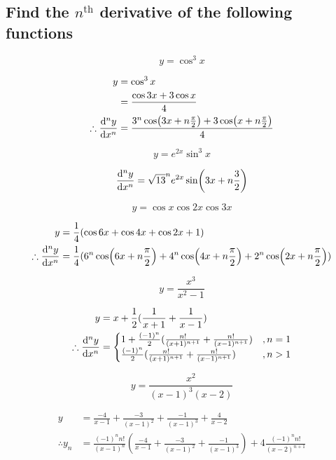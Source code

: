 \subsection{Find the $n^\text{th}$ derivative of the following functions}
\begin{asign}
	\[y=\cos^3x\]
\end{asign}
\begin{anse}
	\[\begin{split}
		y&=\cos^3x\\
		&=\frac{\cos3x+3\cos x}{4}\\
		\therefore \dv[n]{y}{x}&=\frac{3^n\cos(3x+n\frac{\pi}{2})+3\cos(x+n\frac{\pi}{2})}{4}
	\end{split}\]
\end{anse}
\begin{asign}
	\[y=e^{2x}\sin^3x\]
\end{asign}
\begin{anse}
	\[\dv[n]{y}{x}=\sqrt{13}^ne^{2x}\sin(3x+n\frac{3}{2})\]
\end{anse}
\begin{asign}
	\[y=\cos x\cos 2x\cos3x\]
\end{asign}
\begin{anse}
	\[\begin{split}
		y&=\frac{1}{4}(\cos6x+\cos4x+\cos2x+1)\\
		\therefore \dv[n]{y}{x}&=\frac{1}{4}(6^n\cos(6x+n\frac{\pi}{2})+4^n\cos(4x+n\frac{\pi}{2})+2^n\cos(2x+n\frac{\pi}{2}))
	\end{split}\]
\end{anse}
\begin{asign}
	\[y=\frac{x^3}{x^2-1}\]
\end{asign}
\begin{anse}
	\[\begin{split}
		y&=x+\frac{1}{2}(\frac{1}{x+1}+\frac{1}{x-1})\\
		\therefore \dv[n]{y}{x}&=\begin{cases}
			1+\frac{(-1)^n}{2}(\frac{n!}{(x+1)^{n+1}}+\frac{n!}{(x-1)^{n+1}}) &, n=1\\
			\frac{(-1)^n}{2}(\frac{n!}{(x+1)^{n+1}}+\frac{n!}{(x-1)^{n+1}}) &, n>1
		\end{cases}
	\end{split}\]
\end{anse}
\begin{asign}
	\[y=\frac{x^2}{(x-1)^3(x-2)}\]
\end{asign}
\begin{anse}
	\[\begin{split}
		y&=\frac{-4}{x-1}+\frac{-3}{(x-1)^2}+\frac{-1}{(x-1)^3}+\frac{4}{x-2}\\
		\therefore y_n&=\frac{(-1)^nn!}{(x-1)^n}\left(\frac{-4}{x-1}+\frac{-3}{(x-1)^2}+\frac{-1}{(x-1)^3}\right)+4\frac{(-1)^nn!}{(x-2)^{n+1}}
	\end{split}\]
\end{anse}
